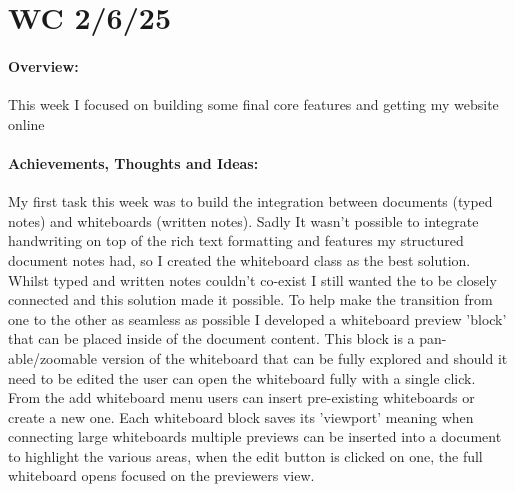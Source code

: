 \section{WC 2/6/25}

\paragraph{Overview:}
This week I focused on building some final core features and getting my website online
\paragraph{Achievements, Thoughts and Ideas:}
My first task this week was to build the integration between documents (typed notes) and whiteboards (written notes). Sadly It wasn't possible to integrate handwriting on top of the rich text formatting and features my structured document notes had, so I created the whiteboard class as the best solution. Whilst typed and written notes couldn't co-exist I still wanted the to be closely connected and this solution made it possible. To help make the transition from one to the other as seamless as possible I developed a whiteboard preview 'block' that can be placed inside of the document content. This block is a pan-able/zoomable version of the whiteboard that can be fully explored and should it need to be edited the user can open the whiteboard fully with a single click. From the add whiteboard menu users can insert pre-existing whiteboards or create a new one. Each whiteboard block saves its 'viewport' meaning when connecting large whiteboards multiple previews can be inserted into a document to highlight the various areas, when the edit button is clicked on one, the full whiteboard opens focused on the previewers view.

